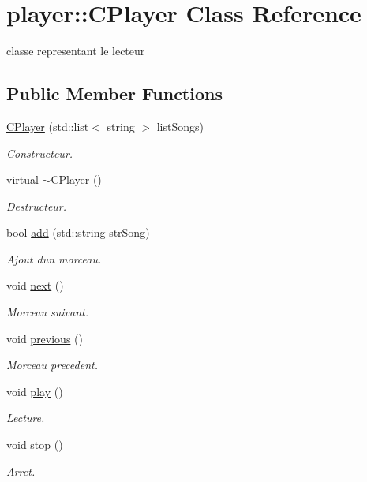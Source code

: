 \hypertarget{classplayer_1_1_c_player}{}\section{player\+:\+:C\+Player Class Reference}
\label{classplayer_1_1_c_player}


classe representant le lecteur  


\subsection*{Public Member Functions}
\begin{DoxyCompactItemize}
\item 
\hyperlink{classplayer_1_1_c_player_a91ed2a2a0c4f4aa1ba480b74ed353b51}{C\+Player} (std\+::list$<$ string $>$ list\+Songs)
\begin{DoxyCompactList}\small\item\em Constructeur. \end{DoxyCompactList}\item 
virtual \hyperlink{classplayer_1_1_c_player_a0a50d2f32e2e135ebf26076986bddfb1}{$\sim$\+C\+Player} ()
\begin{DoxyCompactList}\small\item\em Destructeur. \end{DoxyCompactList}\item 
bool \hyperlink{classplayer_1_1_c_player_a8be0b27d0749fa87f7b574ace798b135}{add} (std\+::string str\+Song)
\begin{DoxyCompactList}\small\item\em Ajout d\textquotesingle{}un morceau. \end{DoxyCompactList}\item 
void \hyperlink{classplayer_1_1_c_player_a7be95660e801b8dfe22e01451e859fce}{next} ()
\begin{DoxyCompactList}\small\item\em Morceau suivant. \end{DoxyCompactList}\item 
void \hyperlink{classplayer_1_1_c_player_a6421f061cfe7b72665d15a453555887e}{previous} ()
\begin{DoxyCompactList}\small\item\em Morceau precedent. \end{DoxyCompactList}\item 
void \hyperlink{classplayer_1_1_c_player_af72054307e459546e3898137d165ebeb}{play} ()
\begin{DoxyCompactList}\small\item\em Lecture. \end{DoxyCompactList}\item 
void \hyperlink{classplayer_1_1_c_player_ad943ab1e4761fd215c0b51646a02c79a}{stop} ()
\begin{DoxyCompactList}\small\item\em Arret. \end{DoxyCompactList}\end{DoxyCompactItemize}


